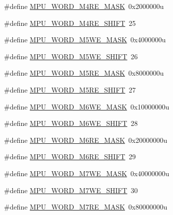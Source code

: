 \begin{DoxyCompactItemize}
\#define \hyperlink{group___m_p_u___register___masks_ga529413212f8c7cf7bd2d1ab6a050d1c8}{M\+P\+U\+\_\+\+W\+O\+R\+D\+\_\+\+M4\+R\+E\+\_\+\+M\+A\+SK}~0x2000000u
\item 
\#define \hyperlink{group___m_p_u___register___masks_ga72594f986e13433ed74e6eabfacf5253}{M\+P\+U\+\_\+\+W\+O\+R\+D\+\_\+\+M4\+R\+E\+\_\+\+S\+H\+I\+FT}~25
\item 
\#define \hyperlink{group___m_p_u___register___masks_ga918f8ced0f8de1a54cc59c57328a18f3}{M\+P\+U\+\_\+\+W\+O\+R\+D\+\_\+\+M5\+W\+E\+\_\+\+M\+A\+SK}~0x4000000u
\item 
\#define \hyperlink{group___m_p_u___register___masks_gaa25703033160cedcbc90416722c87fc9}{M\+P\+U\+\_\+\+W\+O\+R\+D\+\_\+\+M5\+W\+E\+\_\+\+S\+H\+I\+FT}~26
\item 
\#define \hyperlink{group___m_p_u___register___masks_ga04e6c19c601a7bd3dd87a889f309a9f4}{M\+P\+U\+\_\+\+W\+O\+R\+D\+\_\+\+M5\+R\+E\+\_\+\+M\+A\+SK}~0x8000000u
\item 
\#define \hyperlink{group___m_p_u___register___masks_gaa33945bb1d9469089a504d285a8dc021}{M\+P\+U\+\_\+\+W\+O\+R\+D\+\_\+\+M5\+R\+E\+\_\+\+S\+H\+I\+FT}~27
\item 
\#define \hyperlink{group___m_p_u___register___masks_ga954333596403a1acfee73052cb5ea1f9}{M\+P\+U\+\_\+\+W\+O\+R\+D\+\_\+\+M6\+W\+E\+\_\+\+M\+A\+SK}~0x10000000u
\item 
\#define \hyperlink{group___m_p_u___register___masks_ga1cd57764e1dc69513f0bb0bb63c7ca44}{M\+P\+U\+\_\+\+W\+O\+R\+D\+\_\+\+M6\+W\+E\+\_\+\+S\+H\+I\+FT}~28
\item 
\#define \hyperlink{group___m_p_u___register___masks_gaea71b8ad714cf0bc8e007cca8a9a6fd4}{M\+P\+U\+\_\+\+W\+O\+R\+D\+\_\+\+M6\+R\+E\+\_\+\+M\+A\+SK}~0x20000000u
\item 
\#define \hyperlink{group___m_p_u___register___masks_ga302e27597edfb853b8d08552c27d4a17}{M\+P\+U\+\_\+\+W\+O\+R\+D\+\_\+\+M6\+R\+E\+\_\+\+S\+H\+I\+FT}~29
\item 
\#define \hyperlink{group___m_p_u___register___masks_gab63d3094e6173e76e2df25ce9faca8a0}{M\+P\+U\+\_\+\+W\+O\+R\+D\+\_\+\+M7\+W\+E\+\_\+\+M\+A\+SK}~0x40000000u
\item 
\#define \hyperlink{group___m_p_u___register___masks_ga38c58ef487241b3084e6df9b7d6e316e}{M\+P\+U\+\_\+\+W\+O\+R\+D\+\_\+\+M7\+W\+E\+\_\+\+S\+H\+I\+FT}~30
\item 
\#define \hyperlink{group___m_p_u___register___masks_gad6a0ce43c3940a0870853a8601402248}{M\+P\+U\+\_\+\+W\+O\+R\+D\+\_\+\+M7\+R\+E\+\_\+\+M\+A\+SK}~0x80000000u

\end{DoxyCompactItemize}
